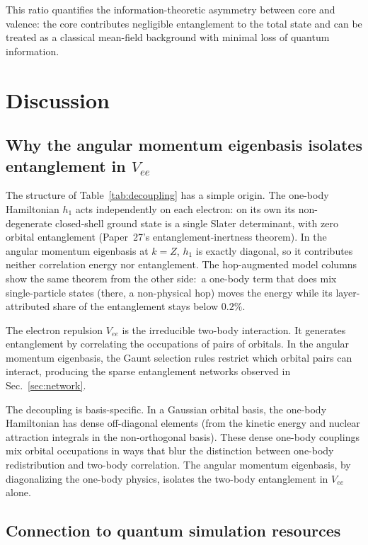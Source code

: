 \documentclass[twocolumn,pra,amsmath,amssymb,superscriptaddress]{revtex4-2}
\begin{document}
This ratio quantifies the information-theoretic asymmetry between
core and valence: the core contributes negligible entanglement to
the total state and can be treated as a classical mean-field
background with minimal loss of quantum information.

\section{Discussion}
\label{sec:discussion}

\subsection{Why the angular momentum eigenbasis isolates
entanglement in $V_{ee}$}

The structure of Table~\ref{tab:decoupling} has a simple origin.
The one-body Hamiltonian $h_1$ acts independently on each electron:
on its own its non-degenerate closed-shell ground state is a single Slater
determinant, with zero orbital entanglement (Paper~27's
entanglement-inertness theorem).  In the angular momentum
eigenbasis at $k = Z$, $h_1$ is exactly diagonal, so it contributes
neither correlation energy nor entanglement.  The hop-augmented model
columns show the same theorem from the other side:\ a one-body term
that does mix single-particle states (there, a non-physical hop) moves
the energy while its layer-attributed share of the entanglement stays
below $0.2\%$.

The electron repulsion $V_{ee}$ is the irreducible two-body
interaction.  It generates entanglement by correlating the
occupations of pairs of orbitals.  In the angular momentum
eigenbasis, the Gaunt selection rules restrict which orbital pairs
can interact, producing the sparse entanglement networks observed
in Sec.~\ref{sec:network}.

The decoupling is basis-specific.  In a Gaussian orbital basis,
the one-body Hamiltonian has dense off-diagonal elements (from
the kinetic energy and nuclear attraction integrals in the
non-orthogonal basis).  These dense one-body couplings mix orbital
occupations in ways that blur the distinction between one-body
redistribution and two-body correlation.  The angular momentum
eigenbasis, by diagonalizing the one-body physics, isolates
the two-body entanglement in $V_{ee}$ alone.

\subsection{Connection to quantum simulation resources}
\end{document}
